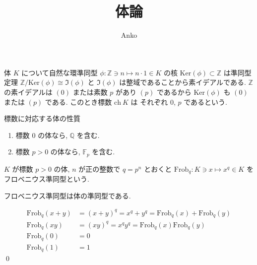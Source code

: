 \documentclass[uplatex,dvipdfmx,a4paper,11pt]{jlreq}
\title{体論}
\author{Anko}
\makeatletter
\theoremstyle{definition}
\renewenvironment{proof}[1][\proofname]{\par
  \normalfont
  \topsep6\p@\@plus6\p@ \trivlist
  \item[\hskip\labelsep{\bfseries #1}\@addpunct{\bfseries}]\ignorespaces\quad\par
}{%
  \qed\endtrivlist\@endpefalse
}
\renewcommand\proofname{証明}
\makeatother
\begin{document}
\maketitle

\begin{definition}
  体 $K$ について自然な環準同型 $\phi:\mathbb{Z}\ni n\mapsto n\cdot 1\in K$ の核 $\mathrm{Ker}(\phi)\subset\mathbb{Z}$ は準同型定理 $\mathbb{Z}/\mathrm{Ker}(\phi)\cong\Im(\phi)$ と $\Im(\phi)$ は整域であることから素イデアルである. $\mathbb{Z}$ の素イデアルは $(0)$ または素数 $p$ があり $(p)$ であるから $\mathrm{Ker}(\phi)$ も $(0)$ または $(p)$ である. このとき標数 $\mathrm{ch}\ K$ は それぞれ $0$, $p$ であるという.
\end{definition}
\begin{theorem}
  標数に対応する体の性質
  \begin{enumerate}
    \item 標数 $0$ の体なら, $\mathbb{Q}$ を含む.
    \item 標数 $p > 0$ の体なら, $\mathbb{F}_p$ を含む.
  \end{enumerate}
\end{theorem}

\begin{definition}
  $K$ が標数 $p>0$ の体, $n$ が正の整数で $q = p^n$ とおくと $\mathrm{Frob}_q:K\ni x\mapsto x^q\in K$ をフロベニウス準同型という.
\end{definition}

\begin{theorem}
  フロベニウス準同型は体の準同型である.
\end{theorem}
\begin{proof}
  \begin{align}
    \mathrm{Frob}_q(x + y) & = (x + y)^q = x^q + y^q = \mathrm{Frob}_q(x) + \mathrm{Frob}_q(y) \\
    \mathrm{Frob}_q(xy)    & = (xy)^q = x^qy^q = \mathrm{Frob}_q(x)\mathrm{Frob}_q(y)          \\
    \mathrm{Frob}_q(0)     & = 0                                                               \\
    \mathrm{Frob}_q(1)     & = 1
  \end{align}
\end{proof}
\end{document}
